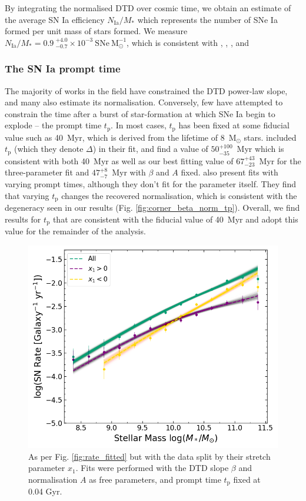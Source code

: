 \documentclass[fleqn,usenatbib]{mnras}
\begin{document}
By integrating the normalised DTD over cosmic time, we obtain an estimate of the average SN Ia efficiency $N_{\mathrm{Ia}}/M_*$ which represents the number of SNe Ia formed per unit mass of stars formed. We measure $N_{\mathrm{Ia}}/M_* = 0.9~_{-0.7}^{+4.0} \times 10^{-3}~\mathrm{SNe}~\mathrm{M}_{\odot}^{-1}$, which is consistent with \citet{Graur2011}, \citet{Maoz2011}, \citet{perrett2012}, and \citet{Graur2013}



\subsubsection{The SN Ia prompt time \label{subsubsec:compare_tp}}

The majority of works in the field have constrained the DTD power-law slope, and many also estimate its normalisation. Conversely, few have attempted to constrain the time after a burst of star-formation at which SNe Ia begin to explode -- the prompt time $t_{\mathrm{p}}$. In most cases, $t_{\mathrm{p}}$ has been fixed at some fiducial value such as 40~Myr, which is derived from the lifetime of 8~M$_{\odot}$ stars. \citet{Castrillo2020} included $t_{\mathrm{p}}$ (which they denote $\Delta$) in their fit, and find a value of $50_{-35}^{+100}$~Myr which is consistent with both 40~Myr as well as our best fitting value of $67_{-23}^{+43}$~Myr for the three-parameter fit and $47_{-7}^{+8}$~Myr with $\beta$ and $A$ fixed. \citet{Heringer2019} also present fits with varying prompt times, although they don't fit for the parameter itself. They find that varying $t_{\mathrm{p}}$ changes the recovered normalisation, which is consistent with the degeneracy seen in our results (Fig. \ref{fig:corner_beta_norm_tp}). Overall, we find results for $t_{\mathrm{p}}$ that are consistent with the fiducial value of 40~Myr and adopt this value for the remainder of the analysis.

\begin{figure}
    \centering
    \includegraphics[width=.5\textwidth]{figs/rate_vs_mass_DTD_fit_beta_norm_Qerf1.1_split_x1.png}
    \caption{As per Fig. \ref{fig:rate_fitted} but with the data split by their stretch parameter $x_1$. Fits were performed with the DTD slope $\beta$ and normalisation $A$ as free parameters, and prompt time $t_{\mathrm{p}}$ fixed at 0.04 Gyr.%
    \label{fig:rate_fitted_split_x1}}
\end{figure}
\end{document}
